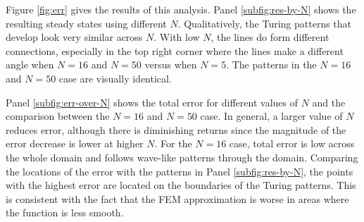 Figure \ref{fig:err} gives the results of this analysis. Panel \ref{subfig:res-by-N} shows the resulting steady states using different $N$. Qualitatively, the Turing patterns that develop look very similar across $N$. With low $N$, the lines do form different connections, especially in the top right corner where the lines make a different angle when $N = 16$ and $N = 50$ versus when $N = 5$. The patterns in the $N = 16$ and $N = 50$ case are visually identical.

Panel \ref{subfig:err-over-N} shows the total error for different values of $N$ and the comparison between the $N = 16$ and $N = 50$ case. In general, a larger value of $N$ reduces error, although there is diminishing returns since the magnitude of the error decrease is lower at higher $N$. For the $N = 16$ case, total error is low across the whole domain and follows wave-like patterns through the domain. Comparing the locations of the error with the patterns in Panel \ref{subfig:res-by-N}, the points with the highest error are located on the boundaries of the Turing patterns. This is consistent with the fact that the FEM approximation is worse in areas where the function is less smooth.
